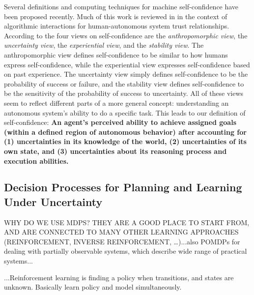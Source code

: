 Several definitions and computing techniques for machine self-confidence have been proposed recently. Much of this work is reviewed in \cite{Israelsen2017-ym} in the context of algorithmic interactions for human-autonomous system trust relationships. %
According to \cite{Sweet2016-tz} the four views on self-confidence are the \textit{anthropomorphic view}, the \textit{uncertainty view}, the \textit{experiential view}, and the \textit{stability view}. The anthropomorphic view defines self-confidence to be similar to how humans express self-confidence, while the experiential view expresses self-confidence based on past experience. The uncertainty view simply defines self-confidence to be the probability of success or failure, and the stability view defines self-confidence to be the sensitivity of the probability of success to uncertainty. All of these views seem to reflect different parts of a more general concept: understanding an autonomous system's ability to do a specific task. 
This leads to our definition of self-confidence: \textbf{An agent's perceived ability to achieve assigned goals (within a defined region of autonomous behavior) after accounting for (1) uncertainties in its knowledge of the world, (2) uncertainties of its own state, and (3) uncertainties about its reasoning process and execution abilities.}




\subsection{Decision Processes for Planning and Learning Under Uncertainty}
WHY DO WE USE MDPS? THEY ARE A GOOD PLACE TO START FROM, AND ARE CONNECTED TO MANY OTHER LEARNING APPROACHES (REINFORCEMENT, INVERSE REINFORCEMENT, \ldots)...also POMDPs for dealing with partially observable systems, which describe wide range of practical systems... 


...Reinforcement learning is finding a policy when transitions, and states are unknown. Basically learn policy and model simultaneously. %

